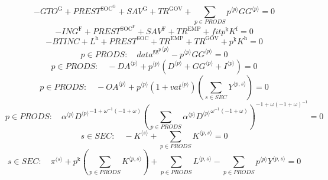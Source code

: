\begin{equation}
-{G\!T\!O}^{\mathrm{G}} + {P\!R\!E\!S\!T}^{\mathrm{SOC}^{\mathrm{G}}} + {S\!A\!V}^{\mathrm{G}} + {T\!R}^{\mathrm{GOV}} + \sum_{p\in {P\!R\!O\!D\!S}} {{p}^{\langle p\rangle}} {{{G\!G}}^{\langle p\rangle}} = 0
\end{equation}
\begin{equation}
-{I\!N\!G}^{\mathrm{F}} + {P\!R\!E\!S\!T}^{\mathrm{SOC}^{\mathrm{F}}} + {S\!A\!V}^{\mathrm{F}} + {T\!R}^{\mathrm{EMP}} + {{f\!i\!t}} {p^{\mathrm{k}}} {K^{\mathrm{f}}} = 0
\end{equation}
\begin{equation}
-{B\!T\!I\!N\!C} + L^{\mathrm{h}} + {P\!R\!E\!S\!T}^{\mathrm{SOC}} + {T\!R}^{\mathrm{EMP}} + {T\!R}^{\mathrm{GOV}} + {p^{\mathrm{k}}} {K^{\mathrm{h}}} = 0
\end{equation}
\begin{equation}
p\in {P\!R\!O\!D\!S}\colon\quad {{d\!a\!t\!a}^{\mathrm{gg}^{\mathrm{p}}}}^{\langle p\rangle} - {{p}^{\langle p\rangle}} {{{G\!G}}^{\langle p\rangle}} = 0
\end{equation}
\begin{equation}
p\in {P\!R\!O\!D\!S}\colon\quad -{{D\!A}}^{\langle p\rangle} + {{p}^{\langle p\rangle}} \left({D}^{\langle p\rangle} + {{G\!G}}^{\langle p\rangle} + {I}^{\langle p\rangle}\right) = 0
\end{equation}
\begin{equation}
p\in {P\!R\!O\!D\!S}\colon\quad -{{O\!A}}^{\langle p\rangle} + {{p}^{\langle p\rangle}} \left(1 + {{v\!a\!t}}^{\langle p\rangle}\right) \left(\sum_{s\in {S\!E\!C}} {Y}^{\langle p,s\rangle}\right) = 0
\end{equation}
\begin{equation}
p\in {P\!R\!O\!D\!S}\colon\quad {{\alpha}^{\langle p\rangle}} {{{D}^{\langle p\rangle}}^{-1 + {\omega}^{-1} \left(-1 + \omega\right)}} {\left(\sum_{p\in {P\!R\!O\!D\!S}} {{\alpha}^{\langle p\rangle}} {{{D}^{\langle p\rangle}}^{{\omega}^{-1} \left(-1 + \omega\right)}}\right)^{-1 + {\omega} \left(-1 + \omega\right)^{-1}}} = 0
\end{equation}
\begin{equation}
s\in {S\!E\!C}\colon\quad -{K}^{\langle s\rangle} + \sum_{p\in {P\!R\!O\!D\!S}} {K}^{\langle p,s\rangle} = 0
\end{equation}
\begin{equation}
s\in {S\!E\!C}\colon\quad {\pi}^{\langle s\rangle} + {p^{\mathrm{k}}} \left(\sum_{p\in {P\!R\!O\!D\!S}} {K}^{\langle p,s\rangle}\right) + \sum_{p\in {P\!R\!O\!D\!S}} {L}^{\langle p,s\rangle} - \sum_{p\in {P\!R\!O\!D\!S}} {{p}^{\langle p\rangle}} {{Y}^{\langle p,s\rangle}} = 0
\end{equation}
